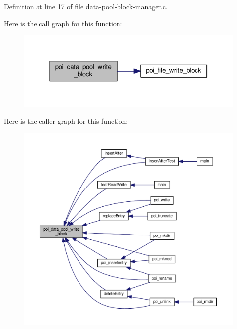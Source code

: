 Definition at line 17 of file data-\/pool-\/block-\/manager.\-c.



Here is the call graph for this function\-:
\nopagebreak
\begin{figure}[H]
\begin{center}
\leavevmode
\includegraphics[width=322pt]{data-pool-block-manager_8c_a10624f1cbc61dd0a8a03aa94d8502567_cgraph}
\end{center}
\end{figure}




Here is the caller graph for this function\-:
\nopagebreak
\begin{figure}[H]
\begin{center}
\leavevmode
\includegraphics[width=350pt]{data-pool-block-manager_8c_a10624f1cbc61dd0a8a03aa94d8502567_icgraph}
\end{center}
\end{figure}


